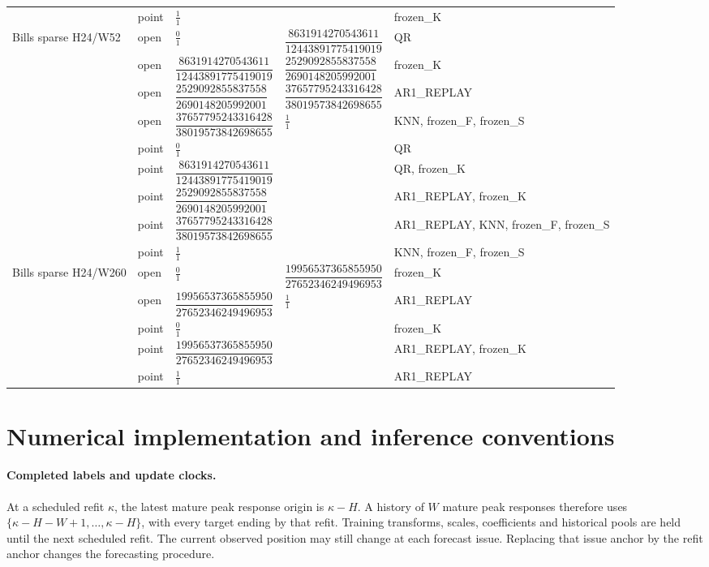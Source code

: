 \documentclass[11pt,a4paper]{article}
\begin{document}
\begin{longtable}{p{28mm}p{10mm}p{39mm}p{39mm}p{28mm}}
 & point & \(\frac{1}{1}\) &  & frozen\_K \\
Bills sparse H24/W52 & open & \(\frac{0}{1}\) & \(\dfrac{8631914270543611}{12443891775419019}\) & QR \\
 & open & \(\dfrac{8631914270543611}{12443891775419019}\) & \(\dfrac{2529092855837558}{2690148205992001}\) & frozen\_K \\
 & open & \(\dfrac{2529092855837558}{2690148205992001}\) & \(\dfrac{37657795243316428}{38019573842698655}\) & AR1\_REPLAY \\
 & open & \(\dfrac{37657795243316428}{38019573842698655}\) & \(\frac{1}{1}\) & KNN, frozen\_F, frozen\_S \\
 & point & \(\frac{0}{1}\) &  & QR \\
 & point & \(\dfrac{8631914270543611}{12443891775419019}\) &  & QR, frozen\_K \\
 & point & \(\dfrac{2529092855837558}{2690148205992001}\) &  & AR1\_REPLAY, frozen\_K \\
 & point & \(\dfrac{37657795243316428}{38019573842698655}\) &  & AR1\_REPLAY, KNN, frozen\_F, frozen\_S \\
 & point & \(\frac{1}{1}\) &  & KNN, frozen\_F, frozen\_S \\
Bills sparse H24/W260 & open & \(\frac{0}{1}\) & \(\dfrac{19956537365855950}{27652346249496953}\) & frozen\_K \\
 & open & \(\dfrac{19956537365855950}{27652346249496953}\) & \(\frac{1}{1}\) & AR1\_REPLAY \\
 & point & \(\frac{0}{1}\) &  & frozen\_K \\
 & point & \(\dfrac{19956537365855950}{27652346249496953}\) &  & AR1\_REPLAY, frozen\_K \\
 & point & \(\frac{1}{1}\) &  & AR1\_REPLAY \\
\end{longtable}
\endgroup



\section{Numerical implementation and inference conventions}\label{sup:implementation}

\paragraph{Completed labels and update clocks.}
At a scheduled refit \(\kappa\), the latest mature peak response origin is
\(\kappa-H\). A history of \(W\) mature peak responses therefore uses
\(\{\kappa-H-W+1,\ldots,\kappa-H\}\), with every target ending by that refit.
Training transforms, scales, coefficients and historical pools are held until
the next scheduled refit. The current observed position may still change at
each forecast issue. Replacing that issue anchor by the refit anchor changes
the forecasting procedure.
\end{document}
